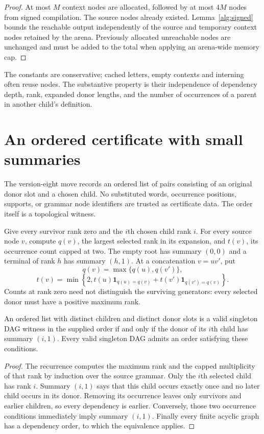 \begin{proof}
At most $M$ context nodes are allocated, followed by at most $4M$
nodes from signed compilation. The source nodes already existed.
Lemma~\ref{alg:signed} bounds the reachable output independently of
the source and temporary context nodes retained by the arena.
Previously allocated unreachable nodes are unchanged and must be
added to the total when applying an arena-wide memory cap.
\end{proof}

The constants are conservative; cached letters, empty contexts and
interning often reuse nodes. The substantive property is their
independence of dependency depth, rank, expanded donor lengths, and
the number of occurrences of a parent in another child's definition.

\section{An ordered certificate with small summaries}
\label{alg:ordered}

The version-eight move records an ordered list of pairs consisting of
an original donor slot and a chosen child. No substituted words,
occurrence positions, supports, or grammar node identifiers are trusted
as certificate data. The order itself is a topological witness.

Give every survivor rank zero and the $i$th chosen child rank $i$.
For every source node $v$, compute $q(v)$, the largest selected rank
in its expansion, and $t(v)$, its occurrence count capped at two.
The empty root has summary $(0,0)$ and a terminal of rank $h$ has
summary $(h,1)$. At a concatenation $v=uv'$, put
\[
 q(v)=\max\{q(u),q(v')\},
\]
\[
 t(v)=\min\!\left\{2,
 t(u)\mathbf 1_{q(u)=q(v)}+
 t(v')\mathbf 1_{q(v')=q(v)}\right\}.
\]
Counts at rank zero need not distinguish the surviving generators:
every selected donor must have a positive maximum rank.

\begin{proposition}
\label{alg:ranked-max}
An ordered list with distinct children and distinct donor slots is a
valid singleton DAG witness in the supplied order if and only if the
donor of its $i$th child has summary $(i,1)$.
Every valid singleton DAG admits an order satisfying these conditions.
\end{proposition}

\begin{proof}
The recurrence computes the maximum rank and the capped multiplicity
of that rank by induction over the source grammar. Only the $i$th
selected child has rank $i$. Summary $(i,1)$ says that this child occurs
exactly once and no later child occurs in its donor. Removing its
occurrence leaves only survivors and earlier children, so every
dependency is earlier. Conversely, those two occurrence conditions
immediately imply summary $(i,1)$. Finally every finite acyclic graph
has a dependency order, to which the equivalence applies.
\end{proof}

